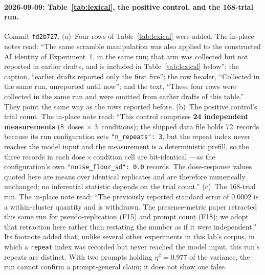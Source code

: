 \documentclass[11pt,a4paper]{article}
\begin{document}
\paragraph{2026-09-09: Table~\ref{tab:lexical}, the positive control, and
the 168-trial run.} Commit \texttt{fd2b727}.
(a)~Four rows of Table~\ref{tab:lexical} were added. The in-place notes
read: ``The same scramble manipulation was also applied to the constructed
AI identity of Experiment~1, in the same run; that arm was collected but
not reported in earlier drafts, and is included in Table~\ref{tab:lexical}
below''; the caption, ``earlier drafts reported only the first five''; the
row header, ``Collected in the same run, unreported until now''; and the
text, ``These four rows were collected in the same run and were omitted
from earlier drafts of this table.'' They point the same way as the rows
reported before.
(b)~The positive control's trial count. The in-place note read: ``This
control comprises \textbf{24 independent measurements} (8~doses $\times$
3~conditions); the shipped data file holds 72~records because its run
configuration sets \texttt{"n\_repeats": 3}, but the repeat index never
reaches the model input and the measurement is a deterministic prefill, so
the three records in each dose\,$\times$\,condition cell are bit-identical
---as the configuration's own \texttt{"noise\_floor\_sd": 0.0} records.
The dose-response values quoted here are means over identical replicates and
are therefore numerically unchanged; no inferential statistic depends on the
trial count.''
(c)~The 168-trial run. The in-place note read: ``The previously reported
standard error of $0.0002$ is a within-cluster quantity and is withdrawn.
The presence-metric paper retracted this same run for pseudo-replication
(F15) and prompt count (F18); we adopt that retraction here rather than
restating the number as if it were independent.'' Its footnote added that,
unlike several other experiments in this lab's corpus, in which a
\texttt{repeat} index was recorded but never reached the model input, this
run's repeats are distinct. With two prompts holding $\eta^2 = 0.977$ of
the variance, the run cannot confirm a prompt-general claim; it does not
show one false.
\end{document}
